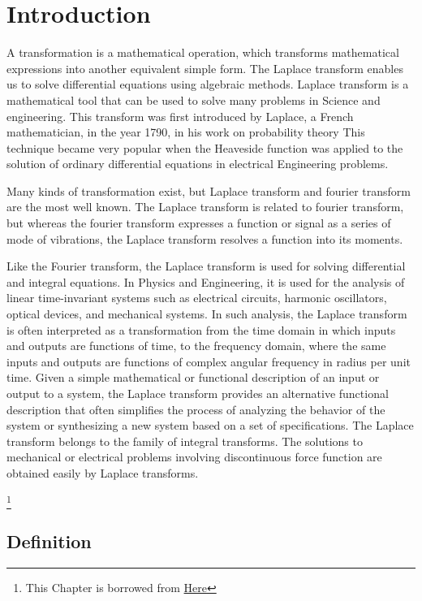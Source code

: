 \chapter{Introduction}

    A transformation is a mathematical operation, which transforms mathematical expressions into another equivalent simple form. The Laplace transform enables us to solve differential equations using algebraic methods. Laplace transform is a mathematical tool that can be used to solve many problems in Science and engineering. This transform was first introduced by Laplace, a French mathematician, in the year 1790, in his work on probability theory This technique became very popular when the Heaveside function was applied to the solution of ordinary differential equations in electrical Engineering problems.

    Many kinds of transformation exist, but Laplace transform and fourier transform are the most well known. The Laplace transform is related to fourier transform, but whereas the fourier transform expresses a function or signal as a series of mode of vibrations, the Laplace transform resolves a function into its moments.

    Like the Fourier transform, the Laplace transform is used for solving differential and integral equations. In Physics and Engineering, it is used for the analysis of linear time-invariant systems such as electrical circuits, harmonic oscillators, optical devices, and mechanical systems. In such analysis, the Laplace transform is often interpreted as a transformation from the time domain in which inputs and outputs are functions of time, to the frequency domain, where the same inputs and outputs are functions of complex angular frequency in radius per unit time. Given a simple mathematical or functional description of an input or output to a system, the Laplace transform provides an alternative functional description that often simplifies the process of analyzing the behavior of the system or synthesizing a new system based on a set of specifications. The Laplace transform belongs to the family of integral transforms. The solutions to mechanical or electrical problems involving discontinuous force function are obtained easily by Laplace transforms.

    \footnote{This Chapter is borrowed from \href{http://www.sist.sathyabama.ac.in/sist_coursematerial/uploads/SMT1401.pdf}{Here}}

    \section{Definition}

